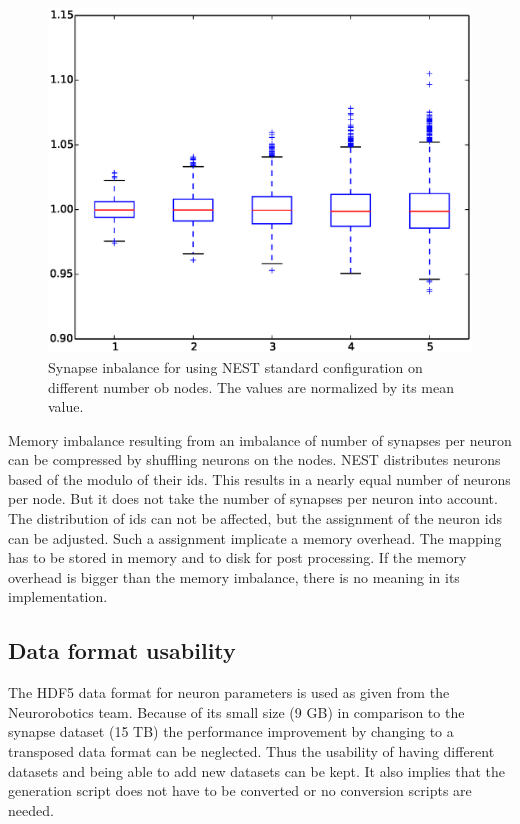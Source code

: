 \documentclass[a4paper]{article}
\begin{document}
\begin{figure}[ht!]
\centering
\includegraphics[scale=0.4]{full_circuit_rack_distribution.eps}
\caption{Synapse inbalance for using NEST standard configuration on different number ob nodes. The values are normalized by its mean value.}
\end{figure}

Memory imbalance resulting from an imbalance of number of synapses per neuron can be compressed by shuffling neurons on the nodes.
NEST distributes neurons based of the modulo of their ids. This results in a nearly equal number of neurons per node.
But it does not take the number of synapses per neuron into account. The distribution of ids can not be affected, but the assignment of the
neuron ids can be adjusted. Such a assignment implicate a memory overhead. The mapping has to be stored in memory and to disk for post processing.
If the memory overhead is bigger than the memory imbalance, there is no meaning in its implementation.


\subsection{Data format usability}

The HDF5 data format for neuron parameters is used as given from the Neurorobotics team.
Because of its small size (9 GB) in comparison to the synapse dataset (15 TB) the performance improvement by changing
to a transposed data format can be neglected. Thus the usability of having different datasets and being able
to add new datasets can be kept. It also implies that the generation script does not have to be converted or no 
conversion scripts are needed.
\end{document}

